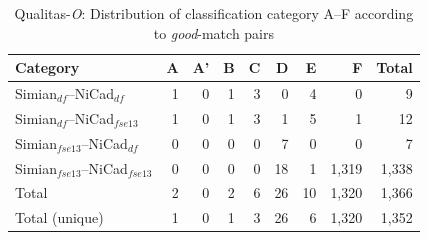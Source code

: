 \documentclass{sig-alternate-05-2015}
\begin{document}

\begin{table}
	\centering
	\caption{Qualitas-\textit{O}: Distribution of classification category A--F according to \textit{good}-match pairs}
	\label{tab:good_classification}
	\small
	\begin{tabular}{|l|r|r|r|r|r|r|r|r|}
		\hline 
		Category   & A   & 	A'   & 	B   & C   & D   &	E   &	F   & Total  \\
		\hline
		Simian$_{df}$--NiCad$_{df}$   & 1 & 0 & 1 & 3 & 0 & 4 & 0 & 9 \\
		Simian$_{df}$--NiCad$_{fse13}$   & 1 & 0 & 1 & 3 & 1 & 5 & 1 & 12 \\
		Simian$_{fse13}$--NiCad$_{df}$   & 0 & 0 & 0 & 0 & 7 & 0 & 0 & 7 \\
		Simian$_{fse13}$--NiCad$_{fse13}$   & 0 & 0 & 0 & 0 & 18 & 1 & 1,319 & 1,338 \\
		\hline
		Total   &   2   &   0   &  2   &  6   &   26   &   10   & 1,320  & 1,366 \\
		Total (unique)  &   1   &   0   &  1   &  3   &   26   &   6   & 1,320  & 1,352 \\
		\hline
	\end{tabular} 
\end{table}
\end{document}
